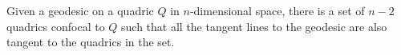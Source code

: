 Given a geodesic on a quadric $Q$ in $n$-dimensional space, there is a set of $n-2$ quadrics confocal to $Q$ such that all the tangent lines to the geodesic are also tangent to the quadrics in the set.
